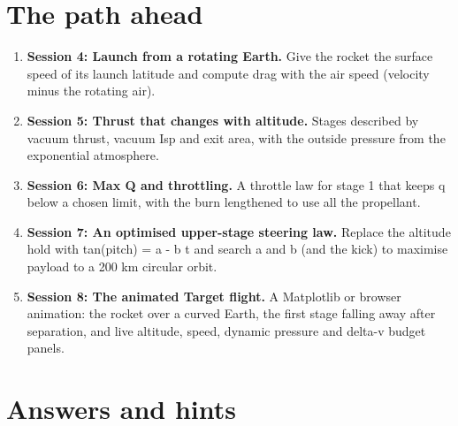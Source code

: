 \documentclass[11pt,a4paper]{article}
\begin{document}
\section{The path ahead}
\begin{enumerate}[nosep]
\item \textbf{Session 4: Launch from a rotating Earth.} Give the rocket the surface speed of its launch latitude and compute drag with the air speed (velocity minus the rotating air).
\item \textbf{Session 5: Thrust that changes with altitude.} Stages described by vacuum thrust, vacuum Isp and exit area, with the outside pressure from the exponential atmosphere.
\item \textbf{Session 6: Max Q and throttling.} A throttle law for stage 1 that keeps q below a chosen limit, with the burn lengthened to use all the propellant.
\item \textbf{Session 7: An optimised upper-stage steering law.} Replace the altitude hold with tan(pitch) = a - b t and search a and b (and the kick) to maximise payload to a 200 km circular orbit.
\item \textbf{Session 8: The animated Target flight.} A Matplotlib or browser animation: the rocket over a curved Earth, the first stage falling away after separation, and live altitude, speed, dynamic pressure and delta-v budget panels.
\end{enumerate}

\section{Answers and hints}
\end{document}
